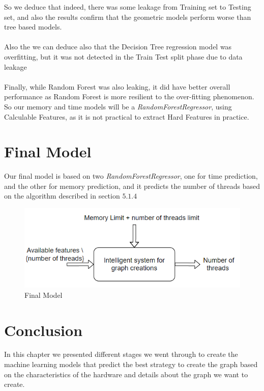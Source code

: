 So we deduce that indeed, there was some leakage from Training set to Testing set, and also the results confirm that the geometric models perform worse than tree based models. 
\\
\\
Also the we can deduce also that the Decision Tree regression model was overfitting, but it was not detected in the Train Test split phase due to data leakage
\\
\\
Finally, while Random Forest was also leaking, it did have better overall performance as Random Forest is more resilient to the over-fitting phenomenon. So our memory and time models will be a \textit{RandomForestRegressor}, using Calculable Features, as it is not practical to extract Hard Features in practice.

\section{Final Model}
Our final model is based on two \textit{RandomForestRegressor}, one for time prediction, and the other for memory prediction, and it predicts the number of threads based on the algorithm described in section $5.1.4$ 

\begin{figure}[h!]
    \centering
    \includegraphics[]{chapters/model.png}
    \caption{Final Model}
    \label{fig:Final Model}
\end{figure}
\FloatBarrier

\section{Conclusion}
In this chapter we presented different stages we went through to create the machine learning models that predict the best strategy to create the graph based on the characteristics of the hardware and details about the graph we want to create. 


